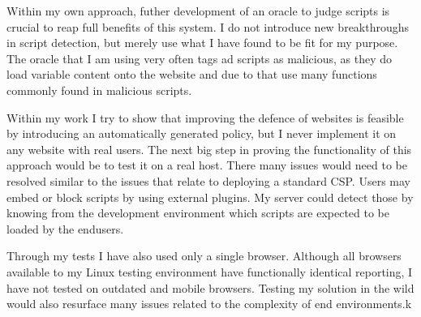 Within my own approach, futher development of an oracle to judge scripts is crucial to reap full benefits of this system.
I do not introduce new breakthroughs in script detection, but merely use what I have found to be fit for my purpose.
The oracle that I am using very often tags ad scripts as malicious, as they do load variable content onto the website and due to that use many functions commonly found in malicious scripts.

Within my work I try to show that improving the defence of websites is feasible by introducing an automatically generated policy, but I never implement it on any website with real users.
The next big step in proving the functionality of this approach would be to test it on a real host.
There many issues would need to be resolved similar to the issues that relate to deploying a standard CSP.
Users may embed or block scripts by using external plugins. 
My server could detect those by knowing from the development environment which scripts are expected to be loaded by the endusers. 

Through my tests I have also used only a single browser.
Although all browsers available to my Linux testing environment have functionally identical reporting, I have not tested on outdated and mobile browsers.
Testing my solution in the wild would also resurface many issues related to the complexity of end environments.k

